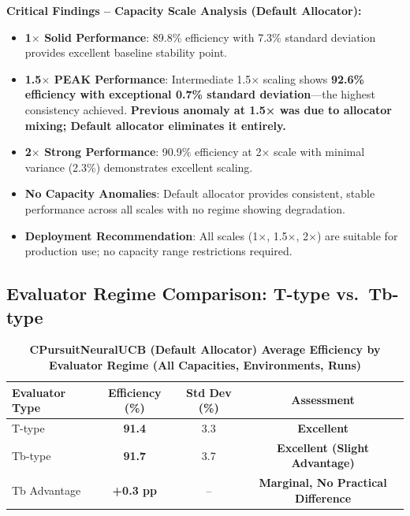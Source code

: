 \documentclass[12pt,a4paper]{article}
\newcommand{\critical}[1]{\textcolor{criticalcolor}{\textbf{#1}}}
\newcommand{\success}[1]{\textcolor{successcolor}{\textbf{#1}}}
\begin{document}
\textbf{Critical Findings – Capacity Scale Analysis (Default Allocator):}
\begin{itemize}
\item \success{1$\times$ Solid Performance}: 89.8\% efficiency with 7.3\% standard deviation provides excellent baseline stability point.

\item \success{1.5$\times$ PEAK Performance}: Intermediate 1.5$\times$ scaling shows \success{92.6\% efficiency with exceptional 0.7\% standard deviation}—the highest consistency achieved. \critical{Previous anomaly at 1.5× was due to allocator mixing; Default allocator eliminates it entirely.}

\item \success{2$\times$ Strong Performance}: 90.9\% efficiency at 2$\times$ scale with minimal variance (2.3\%) demonstrates excellent scaling.

\item \success{No Capacity Anomalies}: Default allocator provides consistent, stable performance across all scales with no regime showing degradation.

\item \success{Deployment Recommendation}: All scales (1$\times$, 1.5$\times$, 2$\times$) are suitable for production use; no capacity range restrictions required.
\end{itemize}

\subsection{Evaluator Regime Comparison: T-type vs.\ Tb-type}

\begin{table}[H]
\centering
\caption{\success{CPursuitNeuralUCB (Default Allocator) Average Efficiency by Evaluator Regime (All Capacities, Environments, Runs)}}
\label{tab:regime-comparison-default}
\begin{tabular}{|l|c|c|c|}
\hline
\textbf{Evaluator Type} & \textbf{Efficiency (\%)} & \textbf{Std Dev (\%)} & \textbf{Assessment} \\
\hline
T-type   & \success{91.4} & 3.3 & \success{Excellent} \\
Tb-type  & \success{91.7} & 3.7 & \success{Excellent (Slight Advantage)} \\
Tb Advantage & \success{+0.3 pp} & -- & \success{Marginal, No Practical Difference} \\
\hline
\end{tabular}
\end{table}
\end{document}
